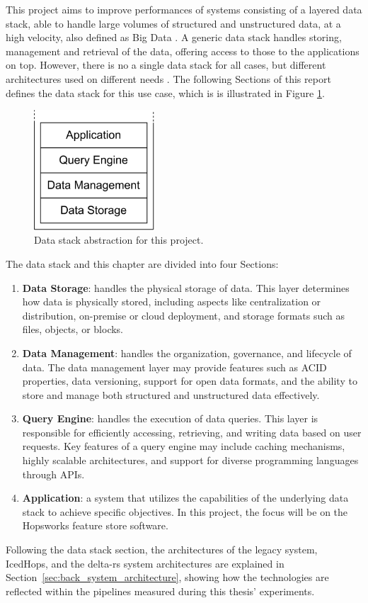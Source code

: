This project aims to improve performances of systems consisting of a layered data stack, able to handle large volumes of structured and unstructured data, at a high velocity, also defined as Big Data \cite{PDFBigData2024}. 
A generic data stack handles storing, management and retrieval of the data, offering access to those to the applications on top. However, there is no a single data stack for all cases, but different architectures used on different needs \cite{framptonCompleteGuideOpen2018,sakrBigDataProcessing2017,IcebergExamples2024}. The following Sections of this report defines the data stack for this use case, which is is illustrated in Figure \ref{fig:datastack}.

\begin{figure}[!ht]
    \begin{center}
      \includegraphics[width=0.4\textwidth]{figures/2-background_and_related_work/datastack.png}
    \end{center}
    \caption[Data stack abstraction]{Data stack abstraction for this project.}
    \label{fig:datastack}
\end{figure}

The data stack and this chapter are divided into four Sections:
\begin{enumerate}
    \item \textbf{Data Storage}: handles the physical storage of data. This layer determines how data is physically stored, including aspects like centralization or distribution, on-premise or cloud deployment, and storage formats such as files, objects, or blocks.
    \item \textbf{Data Management}: handles the organization, governance, and lifecycle of data. The data management layer may provide features such as \gls{ACID} properties, data versioning, support for open data formats, and the ability to store and manage both structured and unstructured data effectively.
    \item \textbf{Query Engine}: handles the execution of data queries. This layer is responsible for efficiently accessing, retrieving, and writing data based on user requests. Key features of a query engine may include caching mechanisms, highly scalable architectures, and support for diverse programming languages through \glspl{API}.
    \item \textbf{Application}: a system that utilizes the capabilities of the underlying data stack to achieve specific objectives. In this project, the focus will be on the Hopsworks feature store software.
\end{enumerate}

Following the data stack section, the architectures of the legacy system, IcedHops, and the delta-rs system architectures are explained in Section~\ref{sec:back_system_architecture}, showing how the technologies are reflected within the pipelines measured during this thesis' experiments.